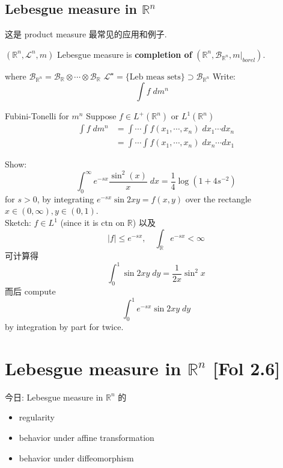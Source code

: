 \documentclass[lang=cn,11pt]{elegantbook}
\begin{document}
\section{Lebesgue measure in $\mathbb{R}^n$}
这是 product measure 最常见的应用和例子. 
\begin{definition}
    $(\mathbb{R}^n, \mathcal{L}^n, m)$ Lebesgue measure is \textbf{completion of } $(\mathbb{R}^n, \mathcal{B}_{\mathbb{R}^n}, m|_{borel})$. 
\end{definition}
where $ \mathcal{B}_{\mathbb{R}^n} =  \mathcal{B}_{\mathbb{R}} \otimes \cdots \otimes \mathcal{B}_{\mathbb{R}}  $
\(\mathcal{L^n }  = \{ \text{Leb meas sets} \}  \supset  \mathcal{B}_{\mathbb{R}^n}\)
Write: \[  \int f \;d m^n   \quad 
\]


\begin{theorem}{Fubini-Tonelli for $m^n$}
    Suppose $f \in L^+(\mathbb{R}^n)$ or $L^1(\mathbb{R}^n)$
\begin{align}
\int f \; dm^n &= \int \cdots \int f(x_1, \cdots, x_n) 
\; dx_1 \cdots dx_n        \\
& = \int \cdots \int f(x_1, \cdots, x_n) 
\; dx_n \cdots dx_1
\end{align}
\end{theorem}

\begin{example}
    Show: \[
    \int_0^\infty e^{-sx} \frac{\sin^2(x)}{x} \; dx = \frac{1}{4} \log(1+ 4s^{-2})
    \]
for $s > 0$, by integrating $e^{-sx} \sin 2xy = f(x,y)$ over the rectangle $x \in (0,\infty), y \in (0,1)$.\\
Sketch: $f \in L^1$ (since it is ctn on $\mathbb{R}$)
以及 \[
|f| \leq e^{-sx}, \quad \int_{\mathbb{R}} e^{-sx} < \infty
\]
可计算得 \[
\int_0 ^1 \sin 2xy \; dy = \frac{1}{2x} \sin^2 x
\]
而后 compute \[
\int_0 ^1    e^{-sx} \sin 2xy \; dy
\] by integration by part for twice.
\end{example}












\chapter{Lebesgue measure in $\mathbb{R}^n$ [Fol 2.6]}
今日: Lebesgue measure in $\mathbb{R}^n$ 的 \begin{itemize}
    \item regularity
    \item behavior under affine transformation
    \item behavior under diffeomorphism
\end{itemize}
\end{document}
